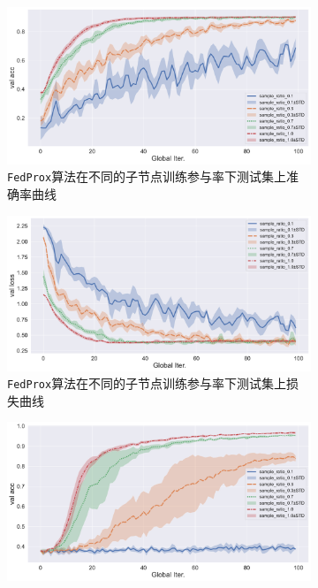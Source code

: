\begin{figure}[ht]
\centering
\begin{subfigure}{.5\textwidth}
  \centering
  \includegraphics[width=.95\linewidth]{figures/fedprox-compare-sample-ratio-val-acc.pdf}
  \caption{\texttt{FedProx}算法在不同的子节点训练参与率下测试集上准确率曲线}
  \label{fig:fedprox-compare-sample-ratio-val-acc}
\end{subfigure}%
\begin{subfigure}{.5\textwidth}
  \centering
  \includegraphics[width=.95\linewidth]{figures/fedprox-compare-sample-ratio-val-loss.pdf}
  \caption{\texttt{FedProx}算法在不同的子节点训练参与率下测试集上损失曲线}
  \label{fig:fedprox-compare-sample-ratio-val-loss}
\end{subfigure}
\begin{subfigure}{.5\textwidth}
  \centering
  \includegraphics[width=.95\linewidth]{figures/proxskip-compare-sample-ratio-val-acc.pdf}

\end{subfigure}
\end{figure}
